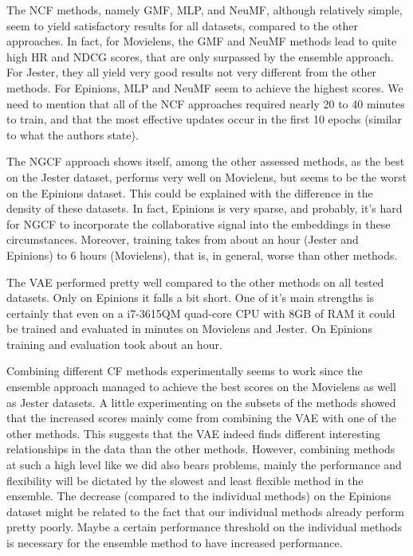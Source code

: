 
The NCF methods, namely GMF, MLP, and NeuMF, although relatively simple, seem to yield satisfactory results for all datasets, compared to the other approaches. 
In fact, for Movielens, the GMF and NeuMF methods lead to quite high HR and NDCG scores, that are only surpassed by the ensemble approach.
For Jester, they all yield very good results not very different from the other methods.
For Epinions, MLP and NeuMF seem to achieve the highest scores.
We need to mention that all of the NCF approaches required nearly 20 to 40 minutes to train, and that the most effective updates occur in the first 10 epochs (similar to what the authors state).


The NGCF approach shows itself, among the other assessed methods, as the best on the Jester dataset, performs very well on Movielens, but seems to be the worst on the Epinions dataset.
This could be explained with the difference in the density of these datasets.
In fact, Epinions is very sparse, and probably, it's hard for NGCF to incorporate the collaborative signal into the embeddings in these circumstances.
Moreover, training takes from about an hour (Jester and Epinions) to 6 hours (Movielens), that is, in general, worse than other methods.

The VAE performed pretty well compared to the other methods on all tested datasets. 
Only on Epinions it falls a bit short. 
One of it's main strengths is certainly that even on a i7-3615QM quad-core CPU with 8GB of RAM it could be trained and evaluated in minutes on Movielens and Jester. On Epinions training and evaluation took about an hour.

Combining different CF methods experimentally seems to work since the ensemble approach managed to achieve the best scores on the Movielens as well as Jester datasets. 
A little experimenting on the subsets of the methods showed that the increased scores mainly  come from combining the VAE with one of the other methods. 
This suggests that the VAE indeed finds different interesting relationships in the data than the other methods. 
However, combining methods at such a high level like we did also bears problems, mainly the performance and flexibility will be dictated by the slowest and least flexible method in the ensemble. 
The decrease (compared to the individual methods) on the Epinions dataset might be related to the fact that our individual methods already perform pretty poorly. 
Maybe a certain performance threshold on the individual methods is necessary for the ensemble method to have increased performance.

